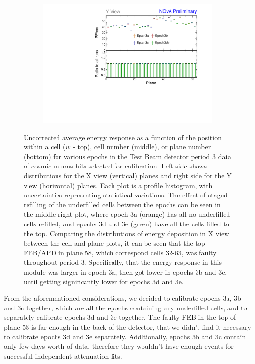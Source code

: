 \begin{figure}[!hbtp]
\begin{subfigure}[b]{0.495\textwidth}
\end{subfigure}
\begin{subfigure}[b]{0.495\textwidth}
\centering
\includegraphics[width=\textwidth]{Plots/TBCalibration/Attenprofs_P3Data_PlanePE_Y_Combined.pdf}
\end{subfigure}
\caption[Uncorrected energy response along $w$, cell and plane for period 3]{Uncorrected average energy response as a function of the position within a cell ($w$ - top), cell number (middle), or plane number (bottom) for various epochs in the Test Beam detector period 3 data of cosmic muons hits selected for calibration. Left side shows distributions for the X view (vertical) planes and right side for the Y view (horizontal) planes. Each plot is a profile histogram, with uncertainties representing statistical variations. The effect of staged refilling of the underfilled cells between the epochs can be seen in the middle right plot, where epoch 3a (orange) has all no underfilled cells refilled, and epochs 3d and 3e (green) have all the cells filled to the top. Comparing the distributions of energy deposition in X view between the cell and plane plots, it can be seen that the top \acrshort{FEB}/\acrshort{APD} in plane 58, which correspond cells 32-63, was faulty throughout period 3. Specifically, that the energy response in this module was larger in epoch 3a, then got lower in epochs 3b and 3c, until getting significantly lower for epochs 3d and 3e.}
\label{fig:Calibhist_period3}
\end{figure}

From the aforementioned considerations, we decided to calibrate epochs 3a, 3b and 3c together, which are all the epochs containing any underfilled cells, and to separately calibrate epochs 3d and 3e together. The faulty \gls{FEB} in the top of plane 58 is far enough in the back of the detector, that we didn't find it necessary to calibrate epochs 3d and 3e separately. Additionally, epochs 3b and 3c contain only few days worth of data, therefore they wouldn't have enough events for successful independent attenuation fits.

